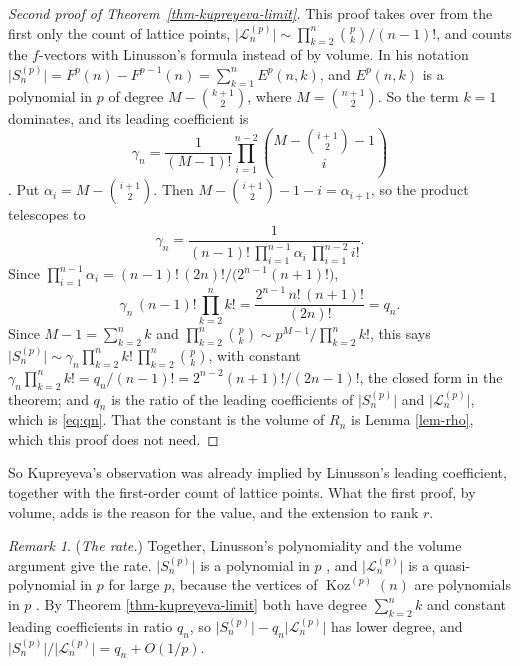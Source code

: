 \documentclass[11pt, a4paper, abstract=yes]{scrartcl}
\theoremstyle{definition}
\theoremstyle{remark}
\newtheorem{remark}[definition]{Remark}
\theoremstyle{plain}
\theoremstyle{remark}
\theoremstyle{plain}
\newcommand{\Koz}{\operatorname{Koz}}
\let\autocite\cite
\begin{document}
\begin{proof}[Second proof of Theorem~\ref{thm-kupreyeva-limit}]
This proof takes over from the first only the count of lattice points,
\(\lvert\mathcal L_n^{(p)}\rvert\sim\prod_{k=2}^n\binom pk/(n-1)!\), and counts the \(f\)-vectors with
Linusson's formula instead of by volume. In his
notation \(\lvert S_n^{(p)}\rvert=F^p(n)-F^{p-1}(n)=\sum_{k=1}^nE^p(n,k)\), and \(E^p(n,k)\) is a
polynomial in \(p\) of degree \(M-\binom{k+1}2\), where \(M=\binom{n+1}2\). So
the term \(k=1\) dominates, and its leading coefficient is
\begin{equation}\label{eq:linusson}
  \gamma_n=\frac1{(M-1)!}\prod_{i=1}^{n-2}\binom{M-\binom{i+1}2-1}{i}
\end{equation}
\autocite[Theorem 3.3, and Proposition 2.8 with its proof]{Linusson1999}. Put
\(\alpha_i=M-\binom{i+1}2\). Then \(M-\binom{i+1}2-1-i=\alpha_{i+1}\), so the product telescopes to
\[
  \gamma_n=\frac{1}{(n-1)!\,\prod_{i=1}^{n-1}\alpha_i\,\prod_{i=1}^{n-2}i!} .
\]
Since \(\prod_{i=1}^{n-1}\alpha_i=(n-1)!\,(2n)!/\bigl(2^{n-1}(n+1)!\bigr)\),
\[
  \gamma_n\,(n-1)!\prod_{k=2}^nk!=\frac{2^{n-1}\,n!\,(n+1)!}{(2n)!}=q_n .
\]
Since \(M-1=\sum_{k=2}^nk\) and \(\prod_{k=2}^n\binom pk\sim p^{M-1}/\prod_{k=2}^nk!\), this says
\(\lvert S_n^{(p)}\rvert\sim\gamma_n\prod_{k=2}^nk!\,\prod_{k=2}^n\binom pk\), with constant
\(\gamma_n\prod_{k=2}^nk!=q_n/(n-1)!=2^{n-2}(n+1)!/(2n-1)!\), the closed form in the theorem; and
\(q_n\) is the ratio of the leading coefficients of \(\lvert S_n^{(p)}\rvert\) and
\(\lvert\mathcal L_n^{(p)}\rvert\), which is \eqref{eq:qn}. That the constant is the volume of \(R_n\)
is Lemma \ref{lem-rho}, which this proof does not need.
\end{proof}

So Kupreyeva's observation was already implied by Linusson's leading coefficient, together with the
first-order count of lattice points. What the first proof, by volume, adds is the reason for the
value, and the extension to rank \(r\).

\begin{remark}
(\emph{The rate.}) Together, Linusson's polynomiality and the volume argument give the rate. \(\lvert S_n^{(p)}\rvert\)
is a polynomial in \(p\) \autocite{Linusson1999},
and \(\lvert\mathcal L_n^{(p)}\rvert\) is a quasi-polynomial in \(p\) for large \(p\), because the
vertices of \(\Koz^{(p)}(n)\) are polynomials in \(p\) \autocite[Theorem 1.4]{ChenLiSam2012}. By
Theorem \ref{thm-kupreyeva-limit} both have degree \(\sum_{k=2}^nk\) and constant leading coefficients in
ratio \(q_n\), so \(\lvert S_n^{(p)}\rvert-q_n\lvert\mathcal L_n^{(p)}\rvert\) has lower degree, and
\(\lvert S_n^{(p)}\rvert/\lvert\mathcal L_n^{(p)}\rvert=q_n+O(1/p)\).
\label{rem-kupreyeva-linusson}
\end{remark}
\end{document}
